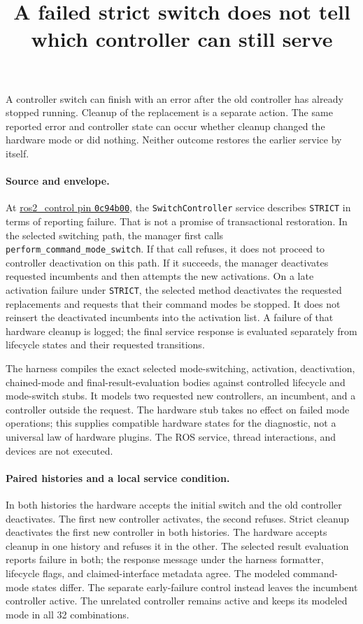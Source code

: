 \documentclass{article}
\title{A failed strict switch does not tell which controller can still serve}
\begin{document}
\maketitle

A controller switch can finish with an error after the old controller has already stopped running. Cleanup of the replacement is a separate action. The same reported error and controller state can occur whether cleanup changed the hardware mode or did nothing. Neither outcome restores the earlier service by itself.

\paragraph{Source and envelope.}
At \href{https://github.com/ros-controls/ros2_control/tree/0c94b008a82731967ba89e2e7379ec6d2f07580b}{ros2\_control pin \texttt{0c94b00}}, the \texttt{SwitchController} service describes \texttt{STRICT} in terms of reporting failure. That is not a promise of transactional restoration. In the selected switching path, the manager first calls \texttt{perform\_command\_mode\_switch}. If that call refuses, it does not proceed to controller deactivation on this path. If it succeeds, the manager deactivates requested incumbents and then attempts the new activations. On a late activation failure under \texttt{STRICT}, the selected method deactivates the requested replacements and requests that their command modes be stopped. It does not reinsert the deactivated incumbents into the activation list. A failure of that hardware cleanup is logged; the final service response is evaluated separately from lifecycle states and their requested transitions.

The harness compiles the exact selected mode-switching, activation, deactivation, chained-mode and final-result-evaluation bodies against controlled lifecycle and mode-switch stubs. It models two requested new controllers, an incumbent, and a controller outside the request. The hardware stub takes no effect on failed mode operations; this supplies compatible hardware states for the diagnostic, not a universal law of hardware plugins. The ROS service, thread interactions, and devices are not executed.

\paragraph{Paired histories and a local service condition.}
In both histories the hardware accepts the initial switch and the old controller deactivates. The first new controller activates, the second refuses. Strict cleanup deactivates the first new controller in both histories. The hardware accepts cleanup in one history and refuses it in the other. The selected result evaluation reports failure in both; the response message under the harness formatter, lifecycle flags, and claimed-interface metadata agree. The modeled command-mode states differ. The separate early-failure control instead leaves the incumbent controller active. The unrelated controller remains active and keeps its modeled mode in all 32 combinations.
\end{document}
